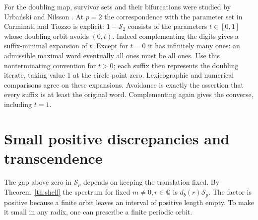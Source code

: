 \documentclass[11pt]{article}
\newcommand{\Q}{\mathbb Q}
\begin{document}
For the doubling map, survivor sets and their bifurcations were studied by
Urba\'nski \cite{urbanski} and Nilsson \cite{nilsson}. At \(p=2\) the correspondence with the parameter set in Carminati and Tiozzo \cite[\S2]{ct} is explicit: \(1-\mathcal S_2\) consists of the parameters \(t\in[0,1]\) whose doubling orbit avoids \((0,t)\). Indeed complementing the digits gives a suffix-minimal expansion of \(t\). Except for \(t=0\) it has infinitely many ones: an admissible maximal word eventually all ones must be all ones. Use this nonterminating convention for \(t>0\); each suffix then represents the doubling iterate, taking value 1 at the circle point zero. Lexicographic and numerical comparisons agree on these expansions. Avoidance is exactly the assertion that every suffix is at least the original word. Complementing again gives the converse, including \(t=1\).


\section{Small positive discrepancies and transcendence}\label{sec:small}
The gap above zero in \(\mathcal S_p\) depends on keeping the translation fixed. By Theorem~\ref{th:shell} the spectrum for fixed \(m\ne0,r\in\Q\) is \(d_b(r)\mathcal S_p\). The factor is positive because a finite orbit leaves an interval of positive length empty. To make it small in any radix, one can prescribe a finite periodic orbit.
\end{document}
